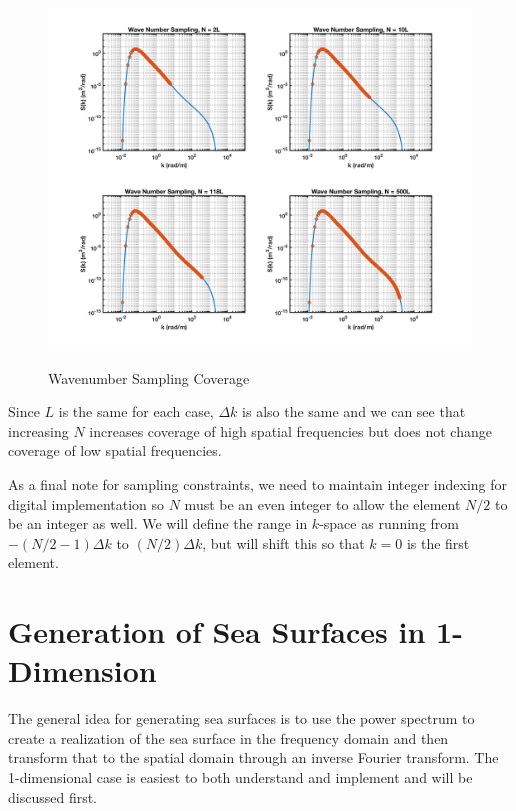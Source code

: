 \begin{figure}[ht]
  \begin{center}
\includegraphics[width=6in]{../media/Ocean_Surface/sampling_coverage.png}
  \end{center}
  \renewcommand{\baselinestretch}{1} \small\normalsize
  \begin{quote}
    \caption[Wavenumber Sampling Coverage]{Wavenumber Sampling Coverage\label{os_fig:6aa}}
  \end{quote}
\end{figure}
\renewcommand{\baselinestretch}{2} \small\normalsize

Since $L$ is the same for each case, $\Delta k$ is also the same and we can see that increasing $N$ increases coverage of high spatial frequencies but does not change coverage of low spatial frequencies.

As a final note for sampling constraints, we need to maintain integer indexing for digital implementation so $N$ must be an even integer to allow the element $N/2$ to be an integer as well. We will define the range in $k$-space as running from $-\left(N/2-1\right)\Delta k$ to $(N/2)\Delta k$, but will shift this so that $k = 0 $ is the first element.

\section {Generation of Sea Surfaces in 1-Dimension}\label{os_sec:1d}
The general idea for generating sea surfaces is to use the power spectrum to create a realization of the sea surface in the frequency domain and then transform that to the spatial domain through an inverse Fourier transform. The 1-dimensional case is easiest to both understand and implement and will be discussed first.

